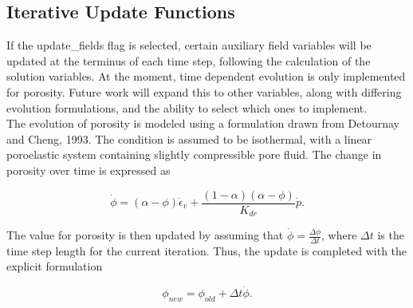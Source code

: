 \subsection{Iterative Update Functions}

If the update\_fields flag is selected, certain auxiliary field variables will be updated at the terminus
of each time step, following the calculation of the solution variables. At the moment, time dependent
evolution is only implemented for porosity. Future work will expand this to other variables, along with
differing evolution formulations, and the ability to select which ones to implement.\\

The evolution of porosity is modeled using a formulation drawn from Detournay and Cheng, 1993. The
condition is assumed to be isothermal, with a linear poroelastic system containing slightly compressible
pore fluid. The change in porosity over time is expressed as

\begin{equation}
    \dot{\phi} = \left(\alpha - \phi\right)\dot{\epsilon}_{v} + \frac{\left(1 - \alpha\right)\left(\alpha - \phi\right)}{K_{dr}} \dot{p}.
\end{equation}

The value for porosity is then updated by assuming that $\dot{\phi} = \frac{\Delta \phi}{\Delta t}$, where $\Delta t$ is the time step
length for the current iteration. Thus, the update is completed with the explicit formulation

\begin{equation}
    \phi_{new} = \phi_{old} + \Delta t \dot{\phi}.
\end{equation}

